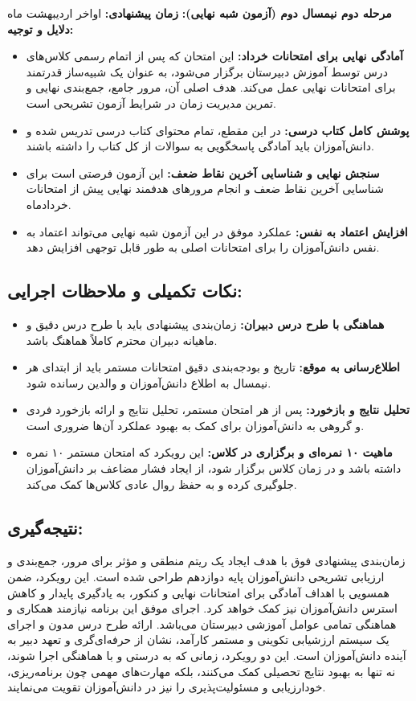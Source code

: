 \documentclass[a4paper,14pt]{article}
\begin{document}
\textbf{مرحله دوم نیمسال دوم (آزمون شبه نهایی):}
\newline\textbf{زمان پیشنهادی:} اواخر اردیبهشت ماه
\newline\textbf{دلایل و توجیه:}
\begin{itemize}
    \item \textbf{آمادگی نهایی برای امتحانات خرداد:} این امتحان که پس از اتمام رسمی کلاس‌های درس توسط آموزش دبیرستان برگزار می‌شود، به عنوان یک شبیه‌ساز قدرتمند برای امتحانات نهایی عمل می‌کند. هدف اصلی آن، مرور جامع، جمع‌بندی نهایی و تمرین مدیریت زمان در شرایط آزمون تشریحی است.
    \item \textbf{پوشش کامل کتاب درسی:} در این مقطع، تمام محتوای کتاب درسی تدریس شده و دانش‌آموزان باید آمادگی پاسخگویی به سوالات از کل کتاب را داشته باشند.
    \item \textbf{سنجش نهایی و شناسایی آخرین نقاط ضعف:} این آزمون فرصتی است برای شناسایی آخرین نقاط ضعف و انجام مرورهای هدفمند نهایی پیش از امتحانات خردادماه.
    \item \textbf{افزایش اعتماد به نفس:} عملکرد موفق در این آزمون شبه نهایی می‌تواند اعتماد به نفس دانش‌آموزان را برای امتحانات اصلی به طور قابل توجهی افزایش دهد.
\end{itemize}
\bigskip
\subsection*{نکات تکمیلی و ملاحظات اجرایی:}
\begin{itemize}
    \item \textbf{هماهنگی با طرح درس دبیران:} زمان‌بندی پیشنهادی باید با طرح درس دقیق و ماهیانه دبیران محترم کاملاً هماهنگ باشد.
    \item \textbf{اطلاع‌رسانی به موقع:} تاریخ و بودجه‌بندی دقیق امتحانات مستمر باید از ابتدای هر نیمسال به اطلاع دانش‌آموزان و والدین رسانده شود.
    \item \textbf{تحلیل نتایج و بازخورد:} پس از هر امتحان مستمر، تحلیل نتایج و ارائه بازخورد فردی و گروهی به دانش‌آموزان برای کمک به بهبود عملکرد آن‌ها ضروری است.
    \item \textbf{ماهیت ۱۰ نمره‌ای و برگزاری در کلاس:} این رویکرد که امتحان مستمر ۱۰ نمره داشته باشد و در زمان کلاس برگزار شود، از ایجاد فشار مضاعف بر دانش‌آموزان جلوگیری کرده و به حفظ روال عادی کلاس‌ها کمک می‌کند.
\end{itemize}
\bigskip

\subsection*{نتیجه‌گیری:}
زمان‌بندی پیشنهادی فوق با هدف ایجاد یک ریتم منطقی و مؤثر برای مرور، جمع‌بندی و ارزیابی تشریحی دانش‌آموزان پایه دوازدهم طراحی شده است. این رویکرد، ضمن همسویی با اهداف آمادگی برای امتحانات نهایی و کنکور، به یادگیری پایدار و کاهش استرس دانش‌آموزان نیز کمک خواهد کرد. اجرای موفق این برنامه نیازمند همکاری و هماهنگی تمامی عوامل آموزشی دبیرستان می‌باشد.
\bigskip
ارائه طرح درس مدون و اجرای یک سیستم ارزشیابی تکوینی و مستمر کارآمد، نشان از حرفه‌ای‌گری و تعهد دبیر به آینده دانش‌آموزان است. این دو رویکرد، زمانی که به درستی و با هماهنگی اجرا شوند، نه تنها به بهبود نتایج تحصیلی کمک می‌کنند، بلکه مهارت‌های مهمی چون برنامه‌ریزی، خودارزیابی و مسئولیت‌پذیری را نیز در دانش‌آموزان تقویت می‌نمایند.
\newpage
\end{document}
